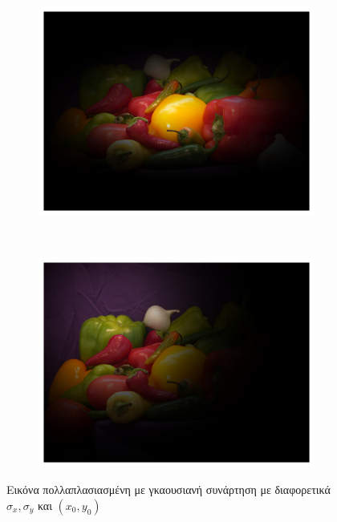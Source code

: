 \begin{figure}[!t]
        \centering
        \begin{subfigure}[t]{0.5\textwidth}
                \centerline{\includegraphics[scale = 0.4]{./images/peppers2.png}}
        \end{subfigure}%
        ~
        \centering
        \begin{subfigure}[t]{0.5\textwidth}
                \centerline{\includegraphics[scale = 0.4]{./images/peppers4.png}}
        \end{subfigure}%
        \caption{Εικόνα πολλαπλασιασμένη με γκαουσιανή συνάρτηση με διαφορετικά $\sigma_x,\sigma_y$ και $(x_0,y_0)$}
        \label{fig:peppers}
\end{figure}

